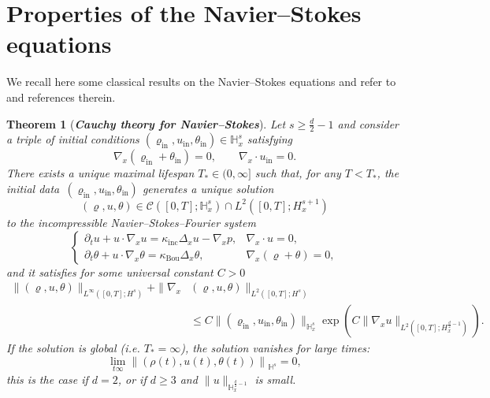 \documentclass[10pt]{amsart}
\newtheorem{theo}{Theorem}[section]
\theoremstyle{definition}\newtheorem{defi}[theo]{Definition}\newtheorem{rema}[theo]{Remark}\newtheorem{exam}[theo]{Example}\newtheorem{exem}[theo]{Example}\newtheorem{nota}[theo]{Notation}
\newcommand{\ini}{\mathrm{in}}
\newcommand{\Inc}{\mathrm{inc}}
\newcommand{\Bou}{\mathrm{Bou}}
\newcommand{\bbH}{\mathbb{H}}
\newcommand{\CC}{\mathcal{C}}
\renewcommand*\le{\leqslant}
\renewcommand*\ge{\geqslant}
\begin{document}
\section{Properties of the Navier--Stokes equations}\label{sec:N-S}

We recall here some classical results on the Navier--Stokes equations and refer to~\cite{R2016} and references therein.

\begin{theo}[\emph{\textbf{Cauchy theory for Navier--Stokes}}]\label{thm:cauchy_NSF}
Let $s \ge \frac{d}{2} - 1$ and consider a triple of initial conditions $(\varrho_\ini, u_\ini, \theta_\ini) \in \bbH^s_x$ satisfying
\[
\nabla_x (\varrho_\ini + \theta_\ini) = 0, \qquad \nabla_x \cdot u_\ini = 0.
\]
There exists a unique maximal lifespan $T_* \in (0, \infty]$ such that, for any $T < T_*$, the initial data~$(\varrho_\ini, u_\ini, \theta_\ini)$ generates a unique solution
\[
(\varrho, u, \theta) \in \CC\left([0, T] ; \bbH^s_x\right) \cap L^2\left([0, T] ; H^{s+1}_x \right)
\]
to the incompressible Navier--Stokes--Fourier system
\begin{equation}\label{eq:NSF}
\begin{cases}
\partial_t u + u \cdot \nabla_x u = \kappa_\Inc \Delta_x u - \nabla_x p, & \nabla_x \cdot u = 0,\\
\partial_t \theta + u \cdot \nabla_x \theta = \kappa_\Bou \Delta_x \theta, & \nabla_x (\varrho + \theta) = 0,
\end{cases}
\end{equation}
and it satisfies for some universal constant $C >0$
\begin{align*}
\| (\varrho, u, \theta) \|_{ L^\infty \left([0, T] ; H^s \right) } + \| \nabla_x & (\varrho, u, \theta) \|_{ L^2 \left([0, T] ; H^s \right) } \\
& \le C \| (\varrho_\ini, u_\ini, \theta_\ini) \|_{\bbH^s_x } \exp\left(C \| \nabla_x u \|_{ L^2 \left([0, T] ; H^{\frac{d}{2}-1}_x \right) } \right).
\end{align*}
If the solution is global (i.e. $T_* = \infty$), the solution vanishes for large times:
\[
\lim_{t \infty} \left\| (\rho(t), u(t), \theta(t)) \right\|_{\bbH^s} = 0,
\]
this is the case if $d = 2$, or if $d \ge 3$ and $\| u \|_{ \bbH^{\frac{d}{2} - 1}_x }$ is small.
\end{theo}
\end{document}
